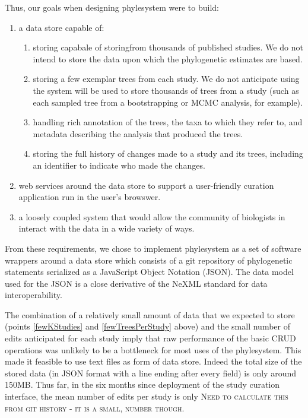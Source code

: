 \documentclass{bioinfo}
\newcommand{\ps}{phylesystem\xspace}
\newcommand{\mthcomment}[1]{{\color{red} \textsc{#1}}\xspace}
\begin{document}
Thus, our goals when designing \ps were to build: 
\begin{enumerate}
    \item  a data store capable of:
        \begin{enumerate}
            \item \label{fewKStudies} storing capabale of storingfrom thousands of published studies. We do not intend to store the 
                data upon which the phylogenetic estimates are based.
            \item \label{fewTreesPerStudy} storing a few exemplar trees from each study. We do not anticipate using the system will be used 
                to store thousands of trees from 
                a study (such as each sampled tree from a bootstrapping or MCMC analysis, for example).
            \item handling rich annotation of the trees, the taxa to which they refer to, and metadata describing 
                the analysis that produced the trees.
            \item storing the full history of changes made to a study and its trees, 
                including an identifier to indicate who made the changes.
        \end{enumerate}
    \item web services around the data store to support a user-friendly curation application run in the user's browswer.
    \item a loosely coupled system that would allow the community of biologists in interact with the data in a wide variety of ways.
\end{enumerate}
From these requirements, we chose to implement \ps as a set of software wrappers around a data store
    which consists of a git \citep{git} repository of phylogenetic statements serialized as a JavaScript Object Notation (JSON).
The data model used for the JSON is a close derivative of the NeXML standard for data interoperability\citep{NeXML}.

The combination of a relatively small amount of data that we expected to store (points \ref{fewKStudies} and \ref{fewTreesPerStudy} above)
    and the small number of edits anticipated for each study imply that
    raw performance of the basic CRUD operations was unlikely to be a bottleneck for most
    uses of the \ps.
This made it feasible to use text files as form of data store.
Indeed the total size of the stored data (in JSON format with a line ending after 
    every field) is only around 150MB.
    Thus far, in the six months since deployment of the study curation interface, the mean number of edits 
    per study is only \mthcomment{Need to calculate this from git history - it is a small, number though}.
\end{document}
